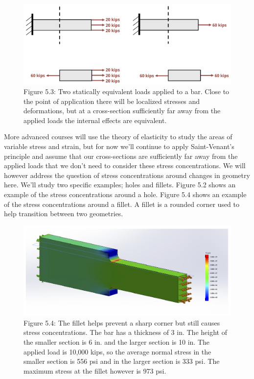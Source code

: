 \documentclass[
  letterpaper,
  DIV=11,
  numbers=noendperiod]{scrreprt}
\begin{document}
\begin{figure}[H]

{\centering \includegraphics[width=5.88542in,height=\textheight]{images/PNGs/Figure 5.3.png}

}

\caption{Figure 5.3: Two statically equivalent loads applied to a bar.
Close to the point of application there will be localized stresses and
deformations, but at a cross-section sufficiently far away from the
applied loads the internal effects are equivalent.}

\end{figure}%

More advanced courses will use the theory of elasticity to study the
areas of variable stress and strain, but for now we'll continue to apply
Saint-Venant's principle and assume that our cross-sections are
sufficiently far away from the applied loads that we don't need to
consider these stress concentrations. We will however address the
question of stress concentrations around changes in geometry here. We'll
study two specific examples; holes and fillets. Figure 5.2 shows an
example of the stress concentrations around a hole. Figure 5.4 shows an
example of the stress concentrations around a fillet. A fillet is a
rounded corner used to help transition between two geometries.

\begin{figure}[H]

{\centering \includegraphics{images/PNGs/Figure 5.4.png}

}

\caption{Figure 5.4: The fillet helps prevent a sharp corner but still
causes stress concentrations. The bar has a thickness of 3 in. The
height of the smaller section is 6 in. and the larger section is 10 in.
The applied load is 10,000 kips, so the average normal stress in the
smaller section is 556 psi and in the larger section is 333 psi. The
maximum stress at the fillet however is 973 psi.}

\end{figure}%
\end{document}
